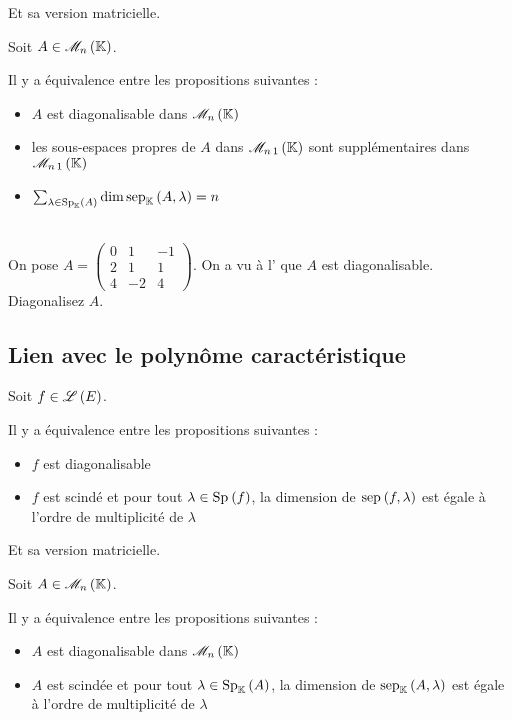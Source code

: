 Et sa version matricielle.

\begin{theo}
Soit \(A\in\M{n}\).

Il y a équivalence entre les propositions suivantes :

\begin{itemize}
    \item \(A\) est diagonalisable dans \(\M{n}\) \\
    \item les sous-espaces propres de \(A\) dans \(\M{n\,1}\) sont supplémentaires dans \(\M{n\,1}\) \\
    \item \(\sum_{\lambda\in\Sp[\K]{A}}\dim\sep[\K]{A}{\lambda}=n\)
\end{itemize}
\end{theo}

\begin{exo}~\\
On pose \(A=\begin{pmatrix}
0 & 1 & -1 \\
2 & 1 & 1 \\
4 & -2 & 4
\end{pmatrix}\). On a vu à l' que \(A\) est diagonalisable. Diagonalisez \(A\).
\end{exo}

\subsection{Lien avec le polynôme caractéristique}

\begin{theo}
Soit \(f\in\mathscr{L}\left(E\right)\).

Il y a équivalence entre les propositions suivantes :

\begin{itemize}
    \item \(f\) est diagonalisable \\
    \item \(f\) est scindé et pour tout \(\lambda\in\Sp{f}\), la dimension de \(\sep{f}{\lambda}\) est égale à l'ordre de multiplicité de \(\lambda\)
\end{itemize}
\end{theo}

Et sa version matricielle.

\begin{theo}
Soit \(A\in\M{n}\).

Il y a équivalence entre les propositions suivantes :

\begin{itemize}
    \item \(A\) est diagonalisable dans \(\M{n}\) \\
    \item \(A\) est scindée et pour tout \(\lambda\in\Sp[\K]{A}\), la dimension de \(\sep[\K]{A}{\lambda}\) est égale à l'ordre de multiplicité de \(\lambda\)
\end{itemize}
\end{theo}

